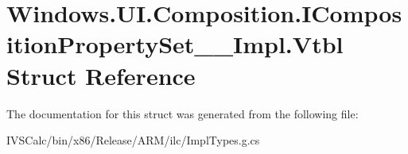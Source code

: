 \hypertarget{struct_windows_1_1_u_i_1_1_composition_1_1_i_composition_property_set_____impl_1_1_vtbl}{}\section{Windows.\+U\+I.\+Composition.\+I\+Composition\+Property\+Set\+\_\+\+\_\+\+Impl.\+Vtbl Struct Reference}
\label{struct_windows_1_1_u_i_1_1_composition_1_1_i_composition_property_set_____impl_1_1_vtbl}


The documentation for this struct was generated from the following file\+:\begin{DoxyCompactItemize}
\item 
I\+V\+S\+Calc/bin/x86/\+Release/\+A\+R\+M/ilc/Impl\+Types.\+g.\+cs\end{DoxyCompactItemize}
